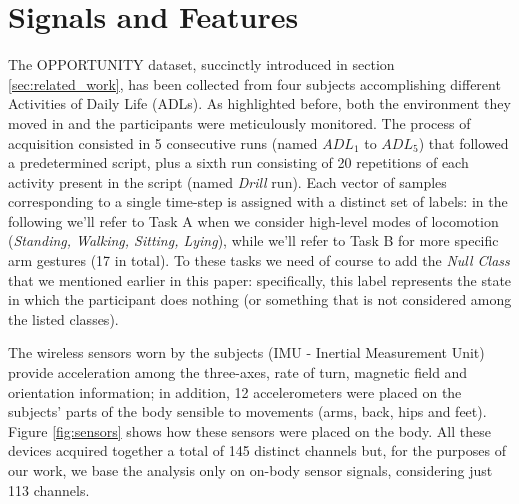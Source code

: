 \section{Signals and Features}
\label{sec:model}

The OPPORTUNITY dataset, succinctly introduced in section \ref{sec:related_work}, has been collected from four subjects accomplishing different Activities of Daily Life (ADLs). As highlighted before, both the environment they moved in and the participants were meticulously monitored.
The process of acquisition consisted in 5 consecutive runs (named $ADL_1$ to $ADL_5$) that followed a predetermined script, plus a sixth run consisting of 20 repetitions of each activity present in the script (named \textit{Drill} run). Each vector of samples corresponding to a single time-step is assigned with a distinct set of labels: in the following we'll refer to Task A when we consider high-level modes of locomotion (\textit{Standing, Walking, Sitting, Lying}), while we'll refer to Task B for more specific arm gestures (17 in total). To these tasks we need of course to add the \textit{Null Class} that we mentioned earlier in this paper: specifically, this label represents the state in which the participant does nothing (or something that is not considered among the listed classes). 

The wireless sensors worn by the subjects (IMU - Inertial Measurement Unit) provide acceleration among the three-axes, rate of turn, magnetic field and orientation information; in addition, 12 accelerometers were placed on the subjects' parts of the body sensible to movements (arms, back, hips and feet). Figure \ref{fig:sensors} shows how these sensors were placed on the body. All these devices acquired together a total of 145 distinct channels but, for the purposes of our work, we base the analysis only on on-body sensor signals, considering just 113 channels.

